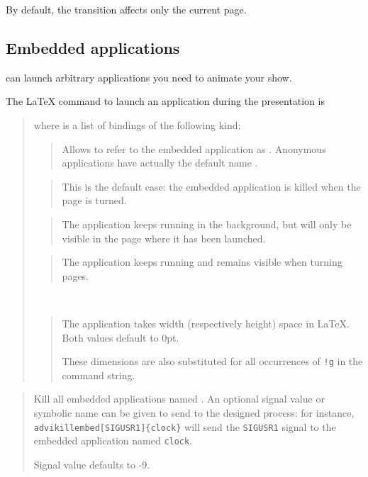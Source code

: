 \documentclass[12pt]{article}
\begin{document}
By default, the transition affects only the current page.

\subsection{Embedded applications}

{\ActiveDVI} can launch arbitrary applications you need to animate your
show.

The {\LaTeX} command to launch an application during the presentation is 

\medskip\noindent
\docdef \adviembed{} 

\begin{quote}
where  is a list of bindings of the following kind:

\begin{quote}
Allows to refer to the embedded application as . 
Anonymous applications have actually the default name .
\end{quote}


\begin{quote}
This is the default case: the embedded application is killed when the page
is turned.
\end{quote}


\begin{quote}
The application keeps running in the background, but will only be visible in
the page where it has been launched.
\end{quote}

\begin{quote}
The application keeps running and remains visible when turning pages.
\end{quote}

\\
\begin{quote}
The application takes  width (respectively height) space in 
{\LaTeX}. Both values default to 0pt.

These dimensions are also substituted for all occurrences of \verb"!g" in
the command string.
\end{quote}

\end{quote}

\medskip\noindent
\docdef \advikillembed {}
\begin{quote}
Kill all embedded applications named .
An optional signal value or symbolic name can be given to send to the
designed process: for instance, {\tt {}advikillembed[SIGUSR1]\{clock\}}
will send the {\tt SIGUSR1} signal to the embedded application named
{\tt clock}.

Signal value defaults to -9.
\end{quote}
\end{document}
